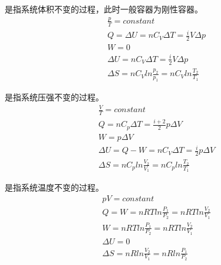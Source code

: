         \begin{Itemize}
            \item {}是指系统体积不变的过程，此时一般容器为刚性容器。            
            \begin{equation}
                \begin{aligned}
                    &\frac{p}{T} = constant \\
                    &Q = \Delta U = nC_{V}\Delta T = \frac{i}{2}V\Delta p \\
                    &W = 0 \\
                    &\Delta U = nC_{V}\Delta T = \frac{i}{2}V\Delta p \\ 
                    &\Delta S = nC_{V}ln\frac{p_{2}}{p_{1}} =nC_{V}ln\frac{T_{2}}{T_{1}}
                \end{aligned}
                \nonumber
            \end{equation}
            \item {}是指系统压强不变的过程。
            \begin{equation}
                \begin{aligned}
                    &\frac{V}{T} = constant \\
                    &Q = nC_{p}\Delta T =\frac{i+2}{2}p\Delta V\\
                    &W = p\Delta{V} \\
                    &\Delta U = Q - W = nC_{V}\Delta T = \frac{i}{2}p\Delta V \\ 
                    &\Delta S = nC_{p}ln\frac{V_{2}}{V_{1}} =nC_{p}ln\frac{T_{2}}{T_{1}}
                \end{aligned}
                \nonumber
            \end{equation}
            \item {}是指系统温度不变的过程。
            \begin{equation}
                \begin{aligned}
                    &pV = constant \\
                    &Q = W = nRTln\frac{P_1}{P_2} = nRTln\frac{V_2}{V_1}\\
                    &W = nRTln\frac{P_1}{P_2} = nRTln\frac{V_2}{V_1} \\
                    &\Delta U = 0 \\ 
                    &\Delta S = nRln\frac{V_{2}}{V_{1}} =nRln\frac{P_{1}}{P_{2}}

\end{aligned}
\end{equation}
\end{Itemize}
